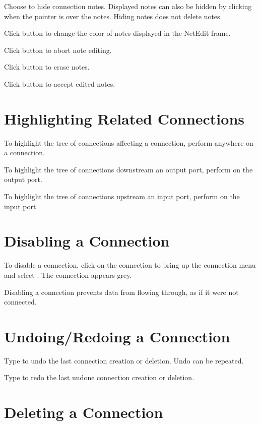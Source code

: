 Choose  to hide connection notes.  Displayed notes can
also be hidden by clicking  when the pointer is over
the notes.  Hiding notes does not delete notes.

Click button  to change the color of notes
displayed in the NetEdit frame.

Click button  to abort note editing.

Click button  to erase notes.

Click button  to accept edited notes.


\section{Highlighting Related Connections}
\label{sec:highlightconnect}

To highlight the tree of connections affecting a connection, perform
 anywhere on a connection.

To highlight the tree of connections downstream an output port,
perform  on the output port.

To highlight the tree of connections upstream an input port,
perform  on the input port.

\section{Disabling a Connection}
\label{sec:disableconnect}

To disable a connection, click  on the connection to
bring up the connection menu and select . The
connection appears grey.

Disabling a connection prevents data from flowing through, as if it were
not connected.

\section{Undoing/Redoing a Connection}
\label{sec:undomod}

Type  to undo the last connection creation or deletion.
Undo can be repeated.

Type  to redo the last undone connection creation or
deletion.
 
\section{Deleting a Connection}
\label{sec:deleteconnections}

